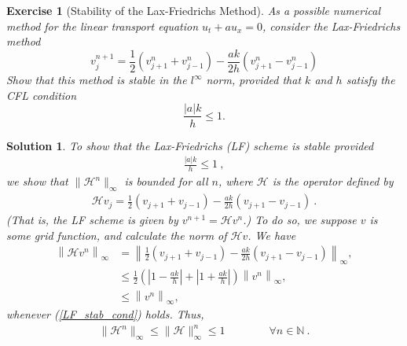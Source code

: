 \documentclass[10pt,letterpaper]{article}
\newcommand{\rb}[1]{ \left(  {#1} \right) }
\newcommand{\norm}[1]{ \left\|  {#1} \right\| }
\theoremstyle{break}
\newtheorem{exercise}{Exercise}
\newtheorem{solution}{Solution}
\begin{document}
\begin{exercise}[Stability of the Lax-Friedrichs Method]
	As a possible numerical method for the linear transport equation $u_t+au_x=0$, consider the Lax-Friedrichs method
	\begin{equation}
		v_{j}^{n+1}=\frac{1}{2}(v_{j+1}^{n}+v_{j-1}^{n})-\frac{ak}{2h}(v_{j+1}^{n}-v_{j-1}^{n})
	\end{equation}
	Show that this method is stable in the $l^\infty$ norm, provided that $k$ and $h$ satisfy the \textit{CFL condition}
	\begin{equation}
		\frac{|a|k}{h}\leq1.
	\end{equation}
\end{exercise}

\begin{solution}
	To show that the Lax-Friedrichs (LF) scheme is stable provided 
    \begin{gather} \label{LF_stab_cond}
        \frac{|a|k}{h}\le 1\ , 
    \end{gather} 
    we show that $\|\mathcal{H}^n\|_\infty$ is bounded for all $n$, where $\mathcal{H}$ is the operator defined by
    \begin{gather}
        \mathcal{H} v_j=\frac{1}{2}\rb{v_{j+1}+v_{j-1}} -\frac{ak}{2h}\rb{v_{j+1}-v_{j-1}}\ .
    \end{gather}
    (That is, the LF scheme is given by $v^{n+1}=\mathcal{H} v^n$.)
    To do so, we suppose $v$ is some grid function, and calculate the norm of $\mathcal{H} v$.
    We have
    \begin{align}	
        \norm{\mathcal{H} v^n}_\infty 
        &
        =
        \norm{
            \frac{1}{2} ( v_{j+1} +v_{j-1} ) 
            -
            \frac{ak}{2h} ( v_{j+1} -v_{j-1} )
        }_\infty, 
        \\
        &\le
        \frac{1}{2}
        \rb{ 
            | 1-\frac{ak}{h} |
            +
            | 1+\frac{ak}{h} |
        }
        \norm{v^n}_\infty,
        \\
        &\le
        \norm{v^n}_\infty,	 
    \end{align}
    whenever (\ref{LF_stab_cond}) holds. Thus, 
    \begin{gather} 	
        \|\mathcal{H}^n\|_\infty \le \|\mathcal{H}\|_\infty^n \le1
        \qquad\qquad \forall n\in \mathbb{N}\ . 
    \end{gather}


\end{solution}
\end{document}
